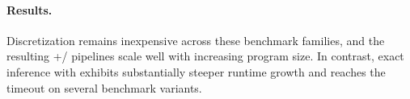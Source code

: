 %
%

\paragraph{Results.} Discretization remains inexpensive across these benchmark families, and the resulting \Slice{}+\Dice{}/\Roulette{} pipelines scale well with increasing program size. In contrast, exact inference with \SPPL{} exhibits substantially steeper runtime growth and reaches the timeout on several benchmark variants.

